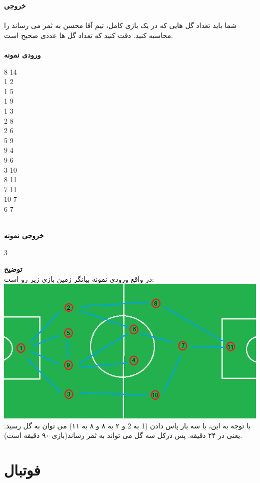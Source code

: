 \documentclass[]{article}
\newcommand{\inputsample}[1]{
    ~\\
    \textbf{ورودی نمونه}
    ~\\
    \begin{tcolorbox}[breakable,boxrule=0pt]
        \begin{latin}
            \large{
                #1
            }
        \end{latin}
    \end{tcolorbox}
}
\newcommand{\outputsample}[1]{
    ~\\
    \textbf{خروجی نمونه}

    \begin{tcolorbox}[breakable,boxrule=0pt]
        \begin{latin}
            \large{
                #1
            }
        \end{latin}
    \end{tcolorbox}
}
\begin{document}
\textbf{خروجی}\\
\\
شما باید تعداد گل هایی که در یک بازی کامل، تیم آقا محسن به ثمر می رساند را محاسبه کنید. دقت کنید که تعداد گل ها عددی صحیح است.
\\

\inputsample{
8 14\\
1 2\\
1 5\\
1 9\\
1 3\\
2 8\\
2 6\\
5 9\\
9 4\\
9 6\\
3 10\\
8 11\\
7 11\\
10 7\\
6 7
}
\outputsample{
3
}

\newpage
\textbf{توضیح}\\
در واقع ورودی نمونه بیانگر زمین بازی زیر رو است:\\
\includegraphics[width=1\textwidth]{goal-baran.png}
با توجه به این، با سه بار پاس دادن (1 به 2 و ۲ به ۸ و ۸ به ۱۱) می توان به گل رسید. یعنی در ۲۴ دقیقه. پس درکل سه گل می تواند به ثمر رساند(بازی ۹۰ دقیقه است).

\newpage
\section{فوتبال}
\end{document}
